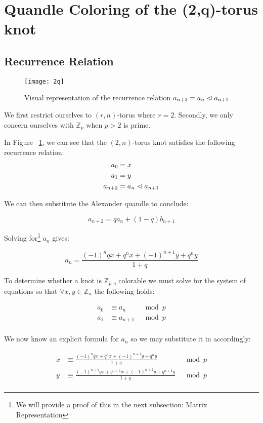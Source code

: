 \documentclass[paper.tex]{subfiles}
\begin{document}
\section{Quandle Coloring of the (2,q)-torus knot}\label{sec:2ntorus}

\subsection{Recurrence Relation}

\begin{figure}[h]
  \centering
  \texttt{[image: 2q]}
  \caption{Visual representation of the recurrence relation $a_{n+2} = a_{n} \vartriangleleft a_{n+1}$~\cite{Cusick}}\label{fig:2q}
\end{figure}

We first restrict ourselves to $(r,n)$-torus where $r = 2$. Secondly, we only concern ourselves with $\mathbb{Z}_p$ when $p > 2$ is prime.

In Figure ~\ref{fig:2q}, we can see that the $(2,n)$-torus knot satisfies the following recurrence relation:
\begin{align*}
	a_0 &= x \\
	a_1 &= y \\
	a_{n+2} &= a_{n} \vartriangleleft a_{n+1} \\
\end{align*}

We can then substitute the Alexander quandle to conclude:

$$ a_{n+2} = qa_{n} + (1-q)b_{n+1} $$

Solving for\footnote{We will provide a proof of this in the next subsection: Matrix Representation}
 $a_n$ gives:

$$a_n = \frac{(-1)^nqx+q^nx+(-1)^{n+1}y+q^ny}{1+q}$$

To determine whether a knot is $\mathbb{Z}_{p,q}$ colorable we must solve for the system of equations so that $\forall x,y \in \mathbb{Z}_n$ the following holds:

\begin{align*}
	a_0 &\equiv a_{n}  & \mod{p} \\
	a_1 &\equiv a_{n+1} & \mod{p} \\
\end{align*}

We now know an explicit formula for $a_n$ so we may substitute it in accordingly:

\begin{align*}
	x &\equiv \frac{(-1)^nqx+q^nx+(-1)^{n+1}y+q^ny}{1+q} & \mod{p} \\
	y &\equiv \frac{(-1)^{n+1}qx+q^{n+1}x+(-1)^{n+2}y+q^{n+1}y}{1+q} & \mod{p} \\
\end{align*}
\end{document}
